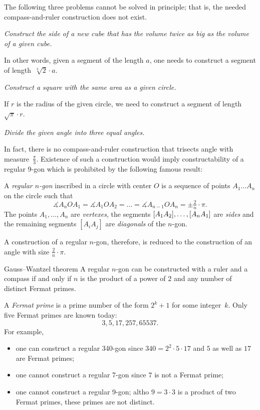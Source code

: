 The following three problems cannot be solved in principle; 
that is, the needed compass-and-ruler construction does not exist.



 {\it Construct the side of a new cube 
that has the volume twice as big as the volume of a given cube.} 

\medskip

In other words, 
given a segment of the length $a$,
one needs to construct a segment of length~$\sqrt[3]{2}\cdot a$.

 {\it Construct a square with the same area as a given circle.} 

\medskip

If $r$ is the radius of the given circle, we need to construct a segment of length~$\sqrt{\pi}\cdot r$. 

{\it Divide the given angle into three equal angles.}

\medskip

In fact, there is no compass-and-ruler construction that trisects angle with measure~$\tfrac\pi3$. 
Existence of such a construction would imply constructability of a regular 9-gon which is prohibited by the following famous result:

A \emph{regular $n$-gon} inscribed in a circle with center $O$ is a sequence of points $A_1\dots A_n$ on the circle such that 
\[\measuredangle A_nOA_1=\measuredangle A_1OA_2=\dots=\measuredangle A_{n-1}OA_n=\pm\tfrac2n\cdot \pi.\]
The points $A_1,\dots, A_n$ are \emph{vertexes},
the segments $[A_1A_2], \z\dots, [A_nA_1]$ are \emph{sides} 
and the remaining segments $[A_iA_j]$ are \emph{diagonals} of the $n$-gon.

A construction of a regular $n$-gon, therefore, is reduced to the construction of an angle with size $\tfrac2n\cdot \pi$.

\begin{thm}{Gauss--Wantzel theorem}
A regular $n$-gon can be constructed with a ruler and a compass 
if and only if 
$n$ is the product of a power of $2$ and any number of distinct Fermat primes.
\end{thm}

A \emph{Fermat prime} is a prime number of the form $2^k+1$ for some integer~$k$.
Only five Fermat primes are known  today:
$$3, 5, 17, 257, 65537.$$
For example, 
\begin{itemize}
\item one can construct a regular 340-gon since $340=2^2\cdot 5\cdot 17$ and $5$ as well as $17$ are Fermat primes;
\item one cannot construct a regular 7-gon since $7$ is not a Fermat prime;
\item one cannot construct a regular 9-gon; 
altho $9=3\cdot 3$ is a product of two Fermat primes, 
these primes are not distinct.
\end{itemize}

